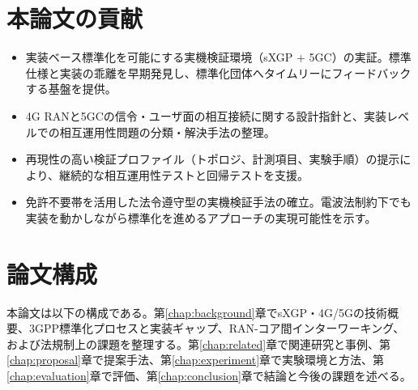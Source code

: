 \section{本論文の貢献}
\begin{itemize}
	\item 実装ベース標準化を可能にする実機検証環境（sXGP + 5GC）の実証。標準仕様と実装の乖離を早期発見し、標準化団体へタイムリーにフィードバックする基盤を提供。
	\item 4G RANと5GCの信令・ユーザ面の相互接続に関する設計指針と、実装レベルでの相互運用性問題の分類・解決手法の整理。
	\item 再現性の高い検証プロファイル（トポロジ、計測項目、実験手順）の提示により、継続的な相互運用性テストと回帰テストを支援。
	\item 免許不要帯を活用した法令遵守型の実機検証手法の確立。電波法制約下でも実装を動かしながら標準化を進めるアプローチの実現可能性を示す。
\end{itemize}

\section{論文構成}
本論文は以下の構成である。第\ref{chap:background}章でsXGP・4G/5Gの技術概要、3GPP標準化プロセスと実装ギャップ、RAN-コア間インターワーキング、および法規制上の課題を整理する。第\ref{chap:related}章で関連研究と事例、第\ref{chap:proposal}章で提案手法、第\ref{chap:experiment}章で実験環境と方法、第\ref{chap:evaluation}章で評価、第\ref{chap:conclusion}章で結論と今後の課題を述べる。
